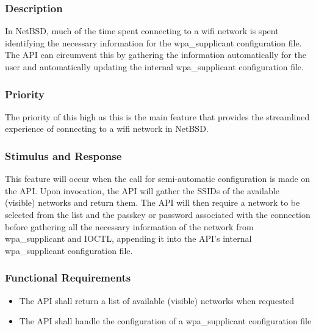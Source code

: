 \subsubsection{Description}
In NetBSD, much of the time spent connecting to a wifi network is spent identifying
the necessary information for the wpa\_supplicant configuration file. The API
can circumvent this by gathering the information automatically for the user
and automatically updating the internal wpa\_supplicant configuration file.

\subsubsection{Priority}
The priority of this high as this is the main feature that provides the streamlined
experience of connecting to a wifi network in NetBSD.

\subsubsection{Stimulus and Response}
This feature will occur when the call for semi-automatic configuration is made
on the API. Upon invocation, the API will gather the SSIDs of the available 
(visible) networks and return them. The API will then require a network to be
selected from the list and the passkey or password associated with the connection
before gathering all the necessary information of the network from wpa\_supplicant
and IOCTL, appending it into the API's internal wpa\_supplicant configuration file.

\subsubsection{Functional Requirements}
\begin{itemize}
  \item The API shall return a list of available (visible) networks when requested
  \item The API shall handle the configuration of a wpa\_supplicant configuration file
\end{itemize}

